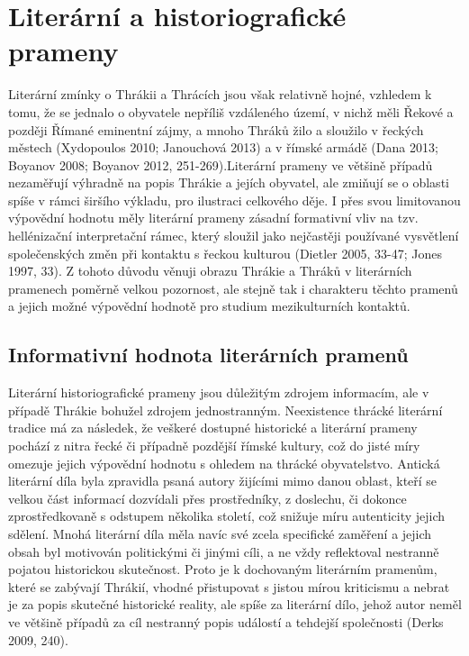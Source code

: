 \section[literární-a-historiografické-prameny]{Literární a historiografické prameny}

Literární zmínky o Thrákii a Thrácích jsou však relativně hojné, vzhledem k tomu, že se jednalo o obyvatele nepříliš vzdáleného území, v nichž měli Řekové a později Římané eminentní zájmy, a mnoho Thráků žilo a sloužilo v řeckých městech (Xydopoulos 2010; Janouchová 2013) a v římské armádě (Dana 2013; Boyanov 2008; Boyanov 2012, 251-269).Literární prameny ve většině případů nezaměřují výhradně na popis Thrákie a jejích obyvatel, ale zmiňují se o oblasti spíše v rámci širšího výkladu, pro ilustraci celkového děje. I přes svou limitovanou výpovědní hodnotu měly literární prameny zásadní formativní vliv na tzv. hellénizační interpretační rámec, který sloužil jako nejčastěji používané vysvětlení společenských změn při kontaktu s řeckou kulturou (Dietler 2005, 33-47; Jones 1997, 33). Z tohoto důvodu věnuji obrazu Thrákie a Thráků v literárních pramenech poměrně velkou pozornost, ale stejně tak i charakteru těchto pramenů a jejich možné výpovědní hodnotě pro studium mezikulturních kontaktů.

\subsection[informativní-hodnota-literárních-pramenů]{Informativní hodnota literárních pramenů}

Literární historiografické prameny jsou důležitým zdrojem informacím, ale v případě Thrákie bohužel zdrojem jednostranným. Neexistence thrácké literární tradice má za následek, že veškeré dostupné historické a literární prameny pochází z nitra řecké či případně pozdější římské kultury, což do jisté míry omezuje jejich výpovědní hodnotu s ohledem na thrácké obyvatelstvo. Antická literární díla byla zpravidla psaná autory žijícími mimo danou oblast, kteří se velkou část informací dozvídali přes prostředníky, z doslechu, či dokonce zprostředkovaně s odstupem několika století, což snižuje míru autenticity jejich sdělení. Mnohá literární díla měla navíc své zcela specifické zaměření a jejich obsah byl motivován politickými či jinými cíli, a ne vždy reflektoval nestranně pojatou historickou skutečnost. Proto je k dochovaným literárním pramenům, které se zabývají Thrákií, vhodné přistupovat s jistou mírou kriticismu a nebrat je za popis skutečné historické reality, ale spíše za literární dílo, jehož autor neměl ve většině případů za cíl nestranný popis událostí a tehdejší společnosti (Derks 2009, 240).

